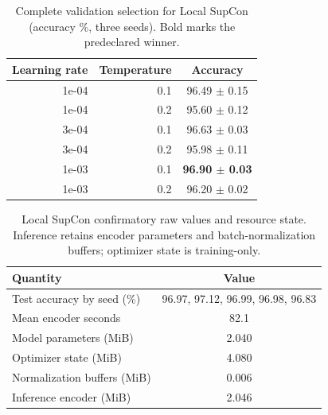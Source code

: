 \begin{table}[H]
\centering
\small
\caption{Complete validation selection for Local SupCon (accuracy \%, three seeds). Bold marks the predeclared winner.}
\label{tab:local-supcon-validation}
\begin{tabular}{rrc}
\toprule
Learning rate & Temperature & Accuracy \\
\midrule
1e-04 & 0.1 & 96.49 $\pm$ 0.15 \\
1e-04 & 0.2 & 95.60 $\pm$ 0.12 \\
3e-04 & 0.1 & 96.63 $\pm$ 0.03 \\
3e-04 & 0.2 & 95.98 $\pm$ 0.11 \\
1e-03 & 0.1 & \textbf{96.90 $\pm$ 0.03} \\
1e-03 & 0.2 & 96.20 $\pm$ 0.02 \\
\bottomrule
\end{tabular}
\end{table}

\begin{table}[H]
\centering
\small
\caption{Local SupCon confirmatory raw values and resource state. Inference retains encoder parameters and batch-normalization buffers; optimizer state is training-only.}
\label{tab:local-supcon-raw}
\begin{tabular}{lc}
\toprule
Quantity & Value \\
\midrule
Test accuracy by seed (\%) & 96.97, 97.12, 96.99, 96.98, 96.83 \\
Mean encoder seconds & 82.1 \\
Model parameters (MiB) & 2.040 \\
Optimizer state (MiB) & 4.080 \\
Normalization buffers (MiB) & 0.006 \\
Inference encoder (MiB) & 2.046 \\
\bottomrule
\end{tabular}
\end{table}

